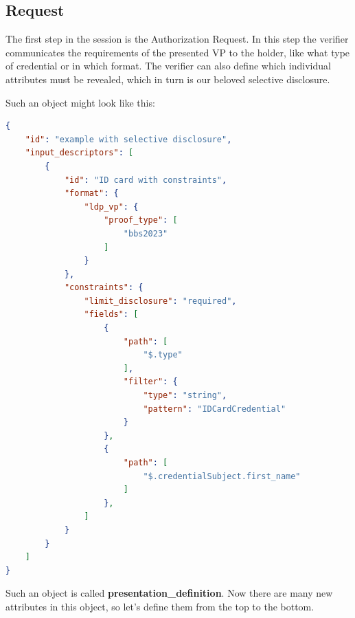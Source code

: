 \documentclass[
	a4paper               %
	,bibliography=totoc   %
	,listof=totoc         %
	,monolingual
	twoside=false,
]{bfhthesis}              %
\begin{document}
\subsection{Request}
The first step in the session is the Authorization Request. 
In this step the verifier communicates the requirements of the presented VP to the holder, like what type of credential or in which format.
The verifier can also define which individual attributes must be revealed, which in turn is our beloved selective disclosure.

Such an object might look like this:
\begin{lstlisting}[language=json,firstnumber=1,caption={Example of a presentation definition},captionpos=b, label={list:presdef}]
{
	"id": "example with selective disclosure",
	"input_descriptors": [
		{
			"id": "ID card with constraints",
			"format": {
				"ldp_vp": {
					"proof_type": [
						"bbs2023"
					]
				}
			},
			"constraints": {
				"limit_disclosure": "required",
				"fields": [
					{
						"path": [
							"$.type"
						],
						"filter": {
							"type": "string",
							"pattern": "IDCardCredential"
						}
					},
					{
						"path": [
							"$.credentialSubject.first_name"
						]
					},
				]
			}
		}
	]
}
\end{lstlisting}

Such an object is called \textbf{presentation\_definition}.
Now there are many new attributes in this object, so let's define them from the top to the bottom. \\
\end{document}
